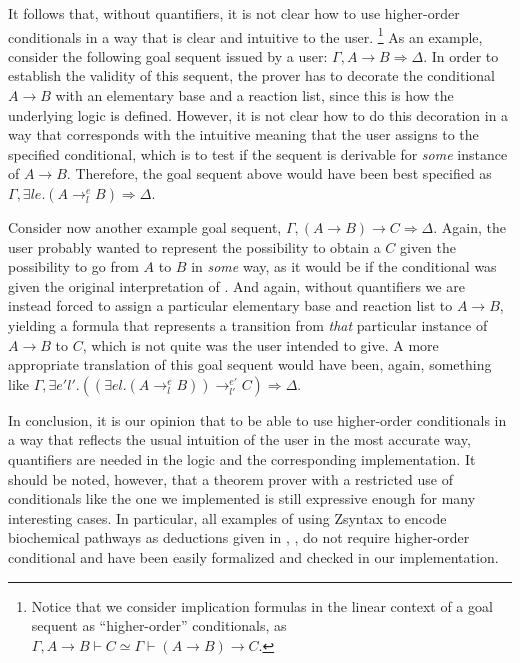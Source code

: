 It follows that, without quantifiers, it is not clear how to use higher-order
conditionals in a way that is clear and intuitive to the user.  \footnote{Notice
  that we consider implication formulas in the linear context of a goal sequent
  as ``higher-order'' conditionals, as
  $\Gamma, A \rightarrow B \vdash C \simeq \Gamma \vdash (A \rightarrow B)
  \rightarrow C$.}  As an example, consider the following goal sequent issued by
a user: $\Gamma, A \rightarrow B \Longrightarrow \Delta$. In order to establish
the validity of this sequent, the prover has to decorate the conditional
$A \rightarrow B$ with an elementary base and a reaction list, since this is how
the underlying logic is defined. However, it is not clear how to do this
decoration in a way that corresponds with the intuitive meaning that the user
assigns to the specified conditional, which is to test if the sequent is
derivable for \emph{some} instance of $A \rightarrow B$.  Therefore, the goal
sequent above would have been best specified as
$\Gamma, \exists l e . (A \rightarrow_l^e B) \Longrightarrow \Delta$.

Consider now another example goal sequent,
$\Gamma, (A \rightarrow B) \rightarrow C \Longrightarrow \Delta$.
Again, the user probably wanted to represent the possibility to obtain a $C$
given the possibility to go from $A$ to $B$ in \emph{some} way, as it would be
if the conditional was given the original interpretation of \cite{adding-logic}.
And again, without quantifiers we are instead forced to assign a particular
elementary base and reaction list to $A \rightarrow B$, yielding a formula that
represents a transition from \emph{that} particular instance of $A \rightarrow
B$ to $C$, which is not quite was the user intended to give.
A more appropriate translation of this goal sequent would have been, again,
something like
$\Gamma, \exists e' l' . ((\exists e l . (A \rightarrow_l^e B)) \rightarrow_{l'}^{e'} C) \Longrightarrow \Delta$.

In conclusion, it is our opinion that to be able to use higher-order
conditionals in a way that reflects the usual
intuition of the user in the most accurate way, quantifiers are needed in the
logic and the corresponding implementation.
It should be noted, however, that a theorem prover with a restricted use of
conditionals like the one we implemented is still expressive enough for many
interesting cases. In particular, all examples of using Zsyntax to encode
biochemical pathways as deductions given in \cite{2010paper},
\cite{adding-logic}, \cite{melanoma} do not require higher-order conditional and
have been easily formalized and checked in our implementation.

